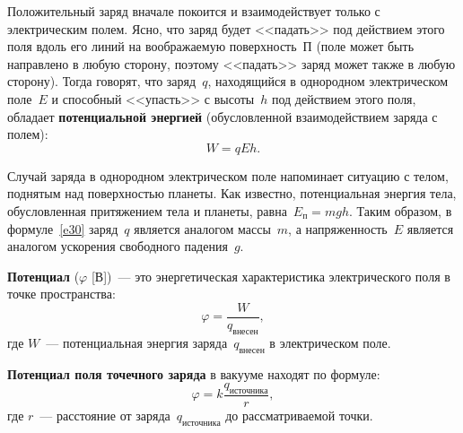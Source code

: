 \documentclass[main.tex]{subfiles}
\begin{document}
\begin{NoHyper}
{%










Положительный заряд вначале покоится и взаимодействует только с электрическим полем. Ясно, что заряд будет <<падать>> под действием этого поля вдоль его линий на воображаемую поверхность~П (поле может быть направлено в любую сторону, поэтому <<падать>> заряд может также в любую сторону). Тогда говорят, что заряд~$q$, находящийся в однородном электрическом поле~$E$ и способный <<упасть>> с высоты~$h$ под действием этого поля, обладает \textbf{потенциальной энергией} (обусловленной взаимодействием заряда с полем):
\begin{equation}
    \label{e30}
    W=qEh.
\end{equation}

}

Случай заряда в однородном электрическом поле напоминает ситуацию с телом, поднятым над поверхностью планеты. Как известно, потенциальная энергия тела, обусловленная притяжением тела и планеты, равна~$E_\text{п}=mgh$. Таким образом, в формуле~\eqref{e30} заряд~$q$ является аналогом массы~$m$, а напряженность~$E$ является аналогом ускорения свободного падения~$g$. 

\textbf{Потенциал} ($\varphi$ [В])~--- это энергетическая характеристика электрического поля в точке пространства:
\begin{equation}
    \varphi=\frac{W}{q_\text{внесен}},
\end{equation}
где $W$~--- потенциальная энергия заряда~$q_\text{внесен}$ в электрическом поле.


\textbf{Потенциал поля точечного заряда} в вакууме
находят по формуле: 
\begin{equation}
    \label{e31}
    \varphi=k\frac{q_\text{источника}}{r},
\end{equation}
где $r$~--- расстояние от заряда~$q_\text{источника}$ до рассматриваемой точки.


\end{NoHyper}
\end{document}
